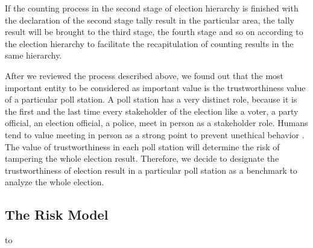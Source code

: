 \documentclass[JIP]{ipsj}
\begin{document}
If the counting process in the second stage of election hierarchy is finished with the declaration of the second stage tally result in the particular area, the tally result will be brought to the third stage, the fourth stage and so on according to the election hierarchy to facilitate the recapitulation of counting results in the same hierarchy.

After we reviewed the process described above, we found out that the most important entity to be considered as important value is the trustworthiness value of a particular poll station. A poll station has a very distinct role, because it is the first and the last time every stakeholder of the election like a voter, a party official, an election official, a police, meet in person as a stakeholder role. Humans tend to value meeting in person as a strong point to prevent unethical behavior \cite{Nogami2009}. The value of trustworthiness in each poll station will determine the risk of tampering the whole election result. Therefore, we decide to designate the trustworthiness of election result in a particular poll station as a benchmark to analyze the whole election.


\subsection{The Risk Model}%

\begin{table}[tb]
\caption{Agent \& Parameter}
\label{tab:modpar}
\hbox to
\end{table}
\end{document}
